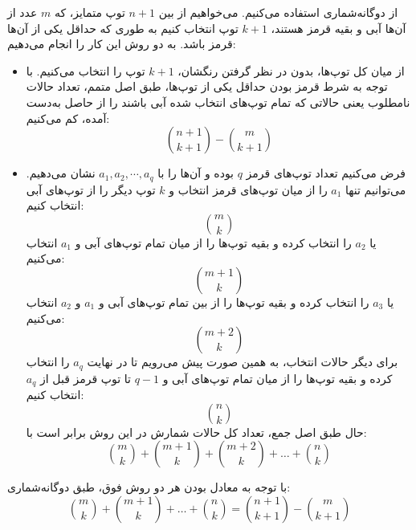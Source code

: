 \p		
از دوگانه‌شماری استفاده می‌کنیم. می‌خواهیم از بین
$n + 1$
توپ متمایز، که 
$m$
عدد از آن‌ها آبی و بقیه قرمز هستند، 
$k + 1$
توپ انتخاب کنیم به طوری که حداقل یکی از آن‌ها قرمز باشد. به دو روش این کار را انجام می‌دهیم:
\begin{itemize}
\item
از میان کل توپ‌ها، بدون در نظر گرفتن رنگشان، 
 $k + 1$
توپ را انتخاب می‌کنیم. با توجه به شرط قرمز بودن حداقل یکی از توپ‌ها، طبق اصل متمم، تعداد حالات نامطلوب یعنی حالاتی که تمام توپ‌های انتخاب شده آبی باشند را از حاصل به‌دست آمده، کم می‌کنیم:
$$\binom{n + 1}{k + 1} - \binom{m}{k + 1}$$
\item
فرض می‌کنیم تعداد توپ‌های قرمز
$q$
بوده و آن‌ها را با
$a_1, a_2, \cdots, a_q$
نشان می‌دهیم. می‌توانیم تنها
$a_1$
را از میان توپ‌های قرمز انتخاب و
$k$
توپ دیگر را از توپ‌های آبی انتخاب ‌کنیم:
$$\binom{m}{k}$$
یا 
$a_2$
را انتخاب کرده و بقیه توپ‌ها را از میان تمام توپ‌های آبی و 
$a_1$
 انتخاب می‌کنیم:
$$\binom{m + 1}{k}$$
یا 
$a_3$
را انتخاب کرده و بقیه توپ‌ها را از بین تمام توپ‌های آبی و 
$a_1$
 و 
 $a_2$
  انتخاب می‌کنیم:
$$\binom{m + 2}{k}$$
برای دیگر حالات انتخاب، به همین صورت پیش می‌رویم تا در نهایت 
$a_q$
را انتخاب کرده و بقیه توپ‌ها را از میان تمام توپ‌های آبی و 
$q - 1$
تا توپ قرمز قبل از
$a_q$
 انتخاب ‌کنیم:
$$\binom{n}{k}$$
حال طبق اصل جمع، تعداد کل حالات شمارش در این روش برابر است با:
$$\binom{m}{k} + \binom{m + 1}{k} + \binom{m + 2}{k} +\ldots +
\binom{n}{k}$$
\end{itemize}
با توجه به معادل بودن هر دو روش فوق، طبق دوگانه‌شماری:
$$\binom{m}{k} + \binom{m + 1}{k} +\ldots +
\binom{n}{k} = \binom{n + 1}{k + 1} - \binom{m}{k + 1}$$